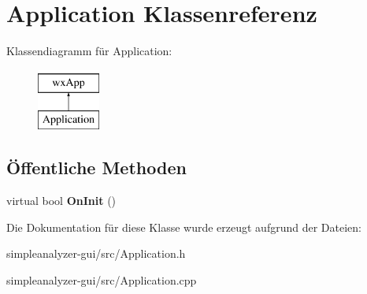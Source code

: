 \hypertarget{classApplication}{\section{Application Klassenreferenz}
\label{classApplication}
}
Klassendiagramm für Application\-:\begin{figure}[H]
\begin{center}
\leavevmode
\includegraphics[height=2.000000cm]{classApplication}
\end{center}
\end{figure}
\subsection*{Öffentliche Methoden}
\begin{DoxyCompactItemize}
\item 
\hypertarget{classApplication_aa6b97a4bf380f56a925910b4223016c5}{virtual bool {\bfseries On\-Init} ()}\label{classApplication_aa6b97a4bf380f56a925910b4223016c5}

\end{DoxyCompactItemize}


Die Dokumentation für diese Klasse wurde erzeugt aufgrund der Dateien\-:\begin{DoxyCompactItemize}
\item 
simpleanalyzer-\/gui/src/Application.\-h\item 
simpleanalyzer-\/gui/src/Application.\-cpp\end{DoxyCompactItemize}
